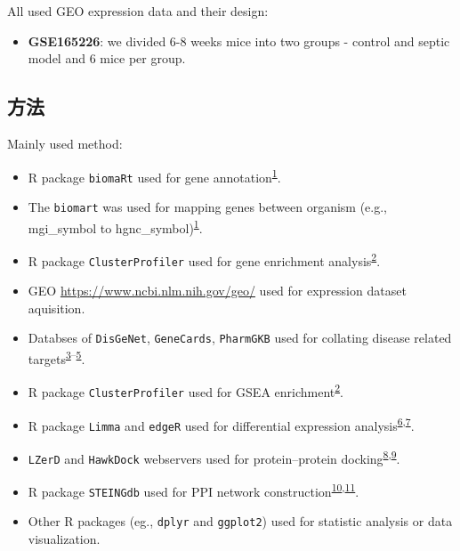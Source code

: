 \documentclass[
]{article}
\providecommand{\tightlist}{%
  \setlength{\itemsep}{0pt}\setlength{\parskip}{0pt}}
\begin{document}
All used GEO expression data and their design:

\begin{itemize}
\tightlist
\item
  \textbf{GSE165226}: we divided 6-8 weeks mice into two groups - control and septic model and 6 mice per group.
\end{itemize}

\hypertarget{ux65b9ux6cd5}{%
\subsection{方法}\label{ux65b9ux6cd5}}

Mainly used method:

\begin{itemize}
\tightlist
\item
  R package \texttt{biomaRt} used for gene annotation\textsuperscript{\protect\hyperlink{ref-MappingIdentifDurinc2009}{1}}.
\item
  The \texttt{biomart} was used for mapping genes between organism (e.g., mgi\_symbol to hgnc\_symbol)\textsuperscript{\protect\hyperlink{ref-MappingIdentifDurinc2009}{1}}.
\item
  R package \texttt{ClusterProfiler} used for gene enrichment analysis\textsuperscript{\protect\hyperlink{ref-ClusterprofilerWuTi2021}{2}}.
\item
  GEO \url{https://www.ncbi.nlm.nih.gov/geo/} used for expression dataset aquisition.
\item
  Databses of \texttt{DisGeNet}, \texttt{GeneCards}, \texttt{PharmGKB} used for collating disease related targets\textsuperscript{\protect\hyperlink{ref-TheDisgenetKnPinero2019}{3}--\protect\hyperlink{ref-PharmgkbAWorBarbar2018}{5}}.
\item
  R package \texttt{ClusterProfiler} used for GSEA enrichment\textsuperscript{\protect\hyperlink{ref-ClusterprofilerWuTi2021}{2}}.
\item
  R package \texttt{Limma} and \texttt{edgeR} used for differential expression analysis\textsuperscript{\protect\hyperlink{ref-LimmaPowersDiRitchi2015}{6},\protect\hyperlink{ref-EdgerDifferenChen}{7}}.
\item
  \texttt{LZerD} and \texttt{HawkDock} webservers used for protein--protein docking\textsuperscript{\protect\hyperlink{ref-LzerdWebserverChrist2021}{8},\protect\hyperlink{ref-HawkdockAWebWeng2019}{9}}.
\item
  R package \texttt{STEINGdb} used for PPI network construction\textsuperscript{\protect\hyperlink{ref-TheStringDataSzklar2021}{10},\protect\hyperlink{ref-CytohubbaIdenChin2014}{11}}.
\item
  Other R packages (eg., \texttt{dplyr} and \texttt{ggplot2}) used for statistic analysis or data visualization.
\end{itemize}
\end{document}
